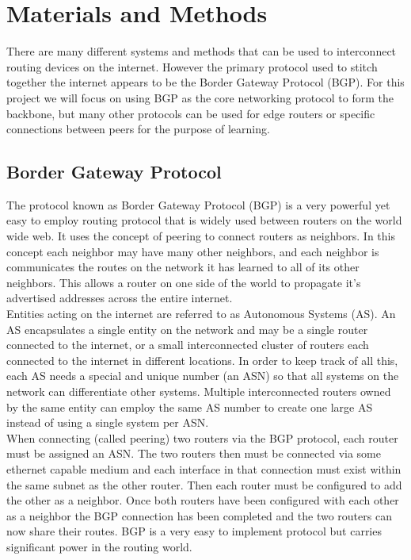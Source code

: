 \documentclass[12pt]{article}
\begin{document}
\section{Materials and Methods}

There are many different systems and methods that can be used to interconnect routing devices on the internet. 
However the primary protocol used to stitch together the internet appears to be the Border Gateway Protocol (BGP).
For this project we will focus on using BGP as the core networking protocol to form the backbone, but many other protocols can be 
used for edge routers or specific connections between peers for the purpose of learning.


\subsection{Border Gateway Protocol}

The protocol known as Border Gateway Protocol (BGP) is a very powerful yet easy to employ routing protocol that
is widely used between routers on the world wide web. It uses the concept of peering to connect routers as neighbors.
In this concept each neighbor may have many other neighbors, and each neighbor is communicates the routes on the network
it has learned to all of its other neighbors. This allows a router on one side of the world to propagate it's advertised
addresses across the entire internet.
\\

Entities acting on the internet are referred to as Autonomous Systems (AS). An AS encapsulates a single entity on the network
and may be a single router connected to the internet, or a small interconnected cluster of routers each connected to the internet
in different locations. In order to keep track of all this, each AS needs a special and unique number (an ASN) so that all systems on the network
can differentiate other systems. Multiple interconnected routers owned by the same entity can employ the same AS number to create one
large AS instead of using a single system per ASN.
\\

When connecting (called peering) two routers via the BGP protocol, each router must be assigned an ASN. The two routers then must be connected via 
some ethernet capable medium and each interface in that connection must exist within the same subnet as the other router. Then each router must
be configured to add the other as a neighbor. Once both routers have been configured with each other as a neighbor the BGP connection has been
completed and the two routers can now share their routes. BGP is a very easy to implement protocol but carries significant power in the routing
world.
\\
\end{document}
